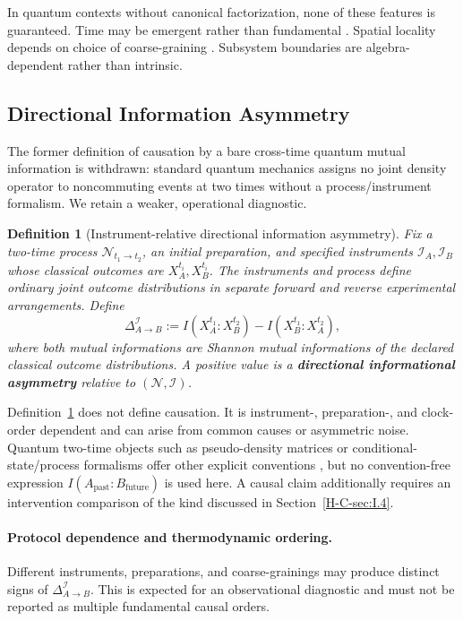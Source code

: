 \documentclass[12pt,a4paper,openany]{book}
\newtheorem{definition}[theorem]{Definition}
\begin{document}
In quantum contexts without canonical factorization, none of these features is guaranteed. Time may be emergent rather than fundamental \cite{PageWootters1983}. Spatial locality depends on choice of coarse-graining \cite{Liu2026PaperA}. Subsystem boundaries are algebra-dependent rather than intrinsic.

\subsection{Directional Information Asymmetry}
\label{H-C-sec:I.2}

The former definition of causation by a bare cross-time quantum mutual information is withdrawn: standard quantum mechanics assigns no joint density operator to noncommuting events at two times without a process/instrument formalism.  We retain a weaker, operational diagnostic.

\begin{definition}[Instrument-relative directional information asymmetry]
\label{H-C-def:causal-asymmetry}
Fix a two-time process $\mathcal N_{t_1\to t_2}$, an initial preparation, and specified instruments $\mathcal I_A,\mathcal I_B$ whose classical outcomes are $X_A^{t_i},X_B^{t_i}$.  The instruments and process define ordinary joint outcome distributions in separate forward and reverse experimental arrangements.  Define
\begin{equation}
\Delta_{A\to B}^{\mathcal I}
:=I\!\left(X_A^{t_1}:X_B^{t_2}\right)
-I\!\left(X_B^{t_1}:X_A^{t_2}\right),
\end{equation}
where both mutual informations are Shannon mutual informations of the declared classical outcome distributions.  A positive value is a \textbf{directional informational asymmetry} relative to $(\mathcal N,\mathcal I)$.
\end{definition}

Definition~\ref{H-C-def:causal-asymmetry} does not define causation.  It is instrument-, preparation-, and clock-order dependent and can arise from common causes or asymmetric noise.  Quantum two-time objects such as pseudo-density matrices or conditional-state/process formalisms offer other explicit conventions \cite{Fitzsimons2015,LeiferSpekkens2013}, but no convention-free expression $I(A_{\mathrm{past}}:B_{\mathrm{future}})$ is used here.  A causal claim additionally requires an intervention comparison of the kind discussed in Section~\ref{H-C-sec:I.4}.

\paragraph{Protocol dependence and thermodynamic ordering.}
Different instruments, preparations, and coarse-grainings may produce distinct signs of $\Delta_{A\to B}^{\mathcal I}$.  This is expected for an observational diagnostic and must not be reported as multiple fundamental causal orders.
\end{document}
